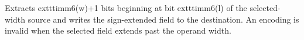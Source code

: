 Extracts 	exttt{imm6(w)+1} bits beginning at bit 	exttt{imm6(l)} of the selected-width source and writes the
sign-extended field to the destination. An encoding is invalid when the selected field extends past the operand
width.
